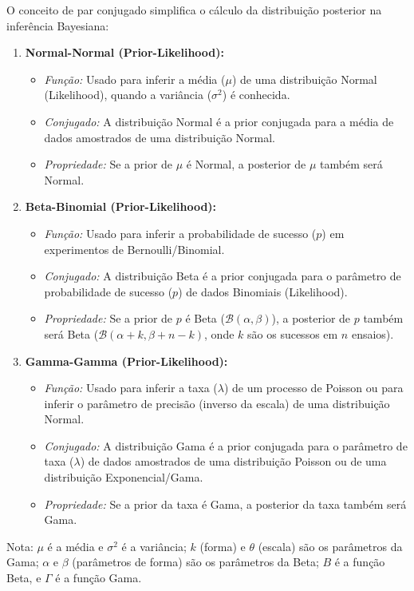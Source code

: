 \documentclass{article}
\begin{document}
O conceito de par conjugado simplifica o cálculo da distribuição posterior na inferência Bayesiana:

\begin{enumerate}
	\item \textbf{Normal-Normal (Prior-Likelihood):}
	\begin{itemize}
		\item \textit{Função:} Usado para inferir a média ($\mu$) de uma distribuição Normal (Likelihood), quando a variância ($\sigma^2$) é conhecida.
		\item \textit{Conjugado:} A distribuição Normal é a prior conjugada para a média de dados amostrados de uma distribuição Normal.
		\item \textit{Propriedade:} Se a prior de $\mu$ é Normal, a posterior de $\mu$ também será Normal.
	\end{itemize}
	
	\item \textbf{Beta-Binomial (Prior-Likelihood):}
	\begin{itemize}
		\item \textit{Função:} Usado para inferir a probabilidade de sucesso ($p$) em experimentos de Bernoulli/Binomial.
		\item \textit{Conjugado:} A distribuição Beta é a prior conjugada para o parâmetro de probabilidade de sucesso ($p$) de dados Binomiais (Likelihood).
		\item \textit{Propriedade:} Se a prior de $p$ é Beta ($\mathcal{B}(\alpha, \beta)$), a posterior de $p$ também será Beta ($\mathcal{B}(\alpha + k, \beta + n - k)$, onde $k$ são os sucessos em $n$ ensaios).
	\end{itemize}
	
	\item \textbf{Gamma-Gamma (Prior-Likelihood):}
	\begin{itemize}
		\item \textit{Função:} Usado para inferir a taxa ($\lambda$) de um processo de Poisson ou para inferir o parâmetro de precisão (inverso da escala) de uma distribuição Normal.
		\item \textit{Conjugado:} A distribuição Gama é a prior conjugada para o parâmetro de taxa ($\lambda$) de dados amostrados de uma distribuição Poisson ou de uma distribuição Exponencial/Gama.
		\item \textit{Propriedade:} Se a prior da taxa é Gama, a posterior da taxa também será Gama.
	\end{itemize}
\end{enumerate}
\footnotesize 
Nota: $\mu$ é a média e $\sigma^2$ é a variância; $k$ (forma) e $\theta$ (escala) são os parâmetros da Gama; $\alpha$ e $\beta$ (parâmetros de forma) são os parâmetros da Beta; $B$ é a função Beta, e $\Gamma$ é a função Gama.
\normalsize
\end{document}

